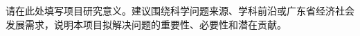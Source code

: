 \begin{GDNSFParagraphs}
请在此处填写项目研究意义。建议围绕科学问题来源、学科前沿或广东省经济社会发展需求，说明本项目拟解决问题的重要性、必要性和潜在贡献。

\GDNSFBlankPara
\end{GDNSFParagraphs}
